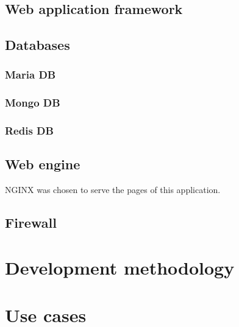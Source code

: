 \subsection{Web application framework}

\subsection{Databases}

\subsubsection{Maria DB}

\subsubsection{Mongo DB}

\subsubsection{Redis DB}

\subsection{Web engine}
NGINX was chosen to serve the pages of this application.

\subsection{Firewall}

\section{Development methodology}

\section{Use cases}

